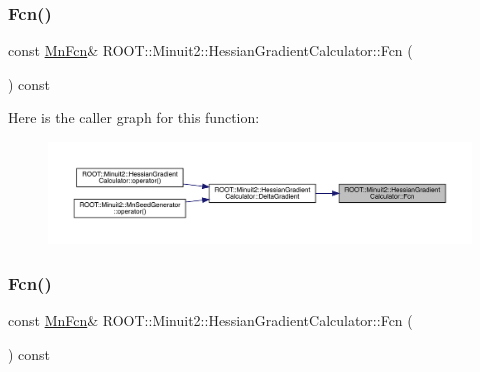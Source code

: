 \subsubsection{\texorpdfstring{Fcn()}{Fcn()}\hspace{0.1cm}{\footnotesize\ttfamily [1/3]}}
{\footnotesize\ttfamily const \mbox{\hyperlink{classROOT_1_1Minuit2_1_1MnFcn}{Mn\+Fcn}}\& R\+O\+O\+T\+::\+Minuit2\+::\+Hessian\+Gradient\+Calculator\+::\+Fcn (\begin{DoxyParamCaption}{ }\end{DoxyParamCaption}) const\hspace{0.3cm}{\ttfamily [inline]}}

Here is the caller graph for this function\+:
\nopagebreak
\begin{figure}[H]
\begin{center}
\leavevmode
\includegraphics[width=350pt]{dc/d17/classROOT_1_1Minuit2_1_1HessianGradientCalculator_ae23f4348f9a64595c39db48aa48d9e09_icgraph}
\end{center}
\end{figure}
\mbox{\label{classROOT_1_1Minuit2_1_1HessianGradientCalculator_ae23f4348f9a64595c39db48aa48d9e09}} 
\subsubsection{\texorpdfstring{Fcn()}{Fcn()}\hspace{0.1cm}{\footnotesize\ttfamily [2/3]}}
{\footnotesize\ttfamily const \mbox{\hyperlink{classROOT_1_1Minuit2_1_1MnFcn}{Mn\+Fcn}}\& R\+O\+O\+T\+::\+Minuit2\+::\+Hessian\+Gradient\+Calculator\+::\+Fcn (\begin{DoxyParamCaption}{ }\end{DoxyParamCaption}) const\hspace{0.3cm}{\ttfamily [inline]}}

\mbox{\label{classROOT_1_1Minuit2_1_1HessianGradientCalculator_ae23f4348f9a64595c39db48aa48d9e09}} 
